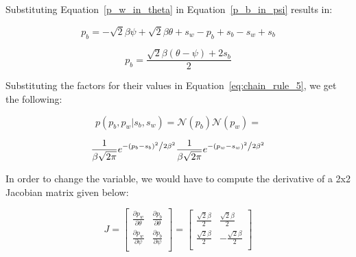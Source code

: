 \documentclass[a4paper,11pt]{article}
\theoremstyle{mytheor}
\begin{document}
Substituting Equation~\ref{p_w_in_theta} in Equation~\ref{p_b_in_psi} results in:

\begin{equation}
    \label{p_w_in_p_b}
    p_b = -\sqrt{2}\beta\psi + \sqrt{2}\beta\theta + s_w - p_b + s_b - s_w + s_b
\end{equation}

\begin{equation}
    \label{p_w_in_p_b_2}
    p_b = \frac{\sqrt{2}\beta(\theta-\psi) + 2s_b}{2}
\end{equation}

Substituting the factors for their values in Equation~\ref{eq:chain_rule_5}, we get the following:

\begin{equation}
    \label{p_w_in_p_b_full_gaussian}
    p(p_b,p_w|s_b,s_w) = \mathcal{N}(p_b)\mathcal{N}(p_w) = 
\end{equation}

\begin{equation}
    \label{p_w_in_p_b_full_gaussian_2}
    \frac{1}{{\beta \sqrt {2\pi } }}e^{{{ - \left( {p_b - s_b } \right)^2 } \mathord{\left/ {\vphantom {{ - \left( {p_b - s_b } \right)^2 } {2\beta ^2 }}} \right. \kern-\nulldelimiterspace} {2\beta ^2 }}}
    \frac{1}{{\beta \sqrt {2\pi } }}e^{{{ - \left( {p_w - s_w } \right)^2 } \mathord{\left/ {\vphantom {{ - \left( {p_w - s_w } \right)^2 } {2\beta ^2 }}} \right. \kern-\nulldelimiterspace} {2\beta ^2 }}}
\end{equation}

In order to change the variable, we would have to compute the derivative of a 2x2 Jacobian matrix given below:

\begin{equation}
    \label{eq:jacobian}
    J = \begin{bmatrix}
            \frac{\partial p_w}{\partial \theta} & \frac{\partial p_b}{\partial \theta}\\
            \frac{\partial p_w}{\partial \psi} & \frac{\partial p_b}{\partial \psi}\\ 
        \end{bmatrix} = 
        \begin{bmatrix}
            \frac{\sqrt{2}\beta}{2} & \frac{\sqrt{2}\beta}{2}\\
            \frac{\sqrt{2}\beta}{2}& -\frac{\sqrt{2}\beta}{2}\\
        \end{bmatrix}
\end{equation}
\end{document}
